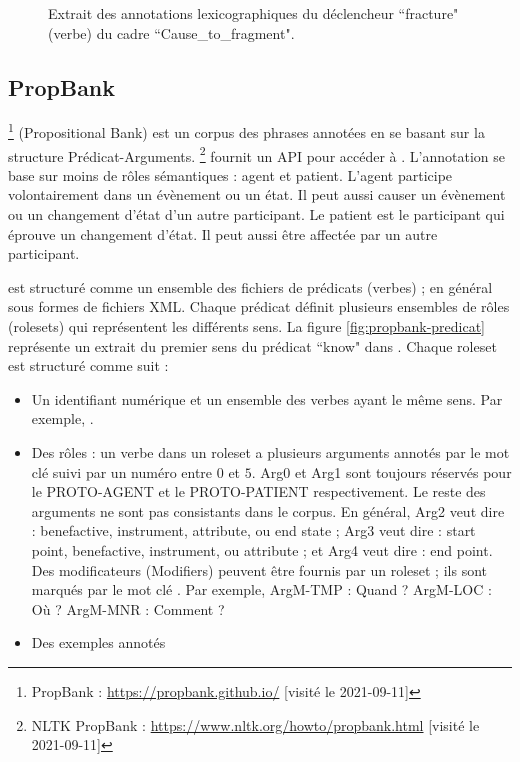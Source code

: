 \documentclass{KodeBook}
\begin{document}
\begin{figure}[ht]
	\caption[Extrait des annotations lexicographiques dans FrameNet.]{Extrait des annotations lexicographiques du déclencheur ``fracture" (verbe) du cadre ``Cause\_to\_fragment".}
	\label{fig:framenet-lex}
\end{figure}

\subsection{PropBank}

\footnote{PropBank : \url{https://propbank.github.io/} [visité le 2021-09-11]} (Propositional Bank) est un corpus des phrases annotées en se basant sur la structure Prédicat-Arguments. 
\footnote{NLTK PropBank : \url{https://www.nltk.org/howto/propbank.html} [visité le 2021-09-11]} fournit un API pour accéder à . 
L'annotation se base sur moins de rôles sémantiques : agent et patient. 
L'agent participe volontairement dans un évènement ou un état.
Il peut aussi causer un évènement ou un changement d'état d'un autre participant. 
Le patient est le participant qui éprouve un changement d'état.
Il peut aussi être affectée par un autre participant.


 est structuré comme un ensemble des fichiers de prédicats (verbes) ; en général sous formes de fichiers XML. 
Chaque prédicat définit plusieurs ensembles de rôles (rolesets) qui représentent les différents sens.
La figure \ref{fig:propbank-predicat} représente un extrait du premier sens du prédicat ``know" dans .
Chaque roleset est structuré comme suit : 
\begin{itemize}
	\item Un identifiant numérique et un ensemble des verbes ayant le même sens.
	Par exemple, .
	
	\item Des rôles : un verbe dans un roleset a plusieurs arguments annotés par le mot clé  suivi par un numéro entre $0$ et $5$. 
	Arg0 et Arg1 sont toujours réservés pour le PROTO-AGENT et le PROTO-PATIENT respectivement. 
	Le reste des arguments ne sont pas consistants dans le corpus. 
	En général, Arg2 veut dire : benefactive, instrument, attribute, ou end state ; Arg3 veut dire : start point, benefactive, instrument, ou attribute ; et Arg4 veut dire : end point.
	Des modificateurs (Modifiers) peuvent être fournis par un roleset ; ils sont marqués par le mot clé . 
	Par exemple, ArgM-TMP : Quand ? ArgM-LOC : Où ? ArgM-MNR : Comment ?
	\item Des exemples annotés
\end{itemize} 
\end{document}
